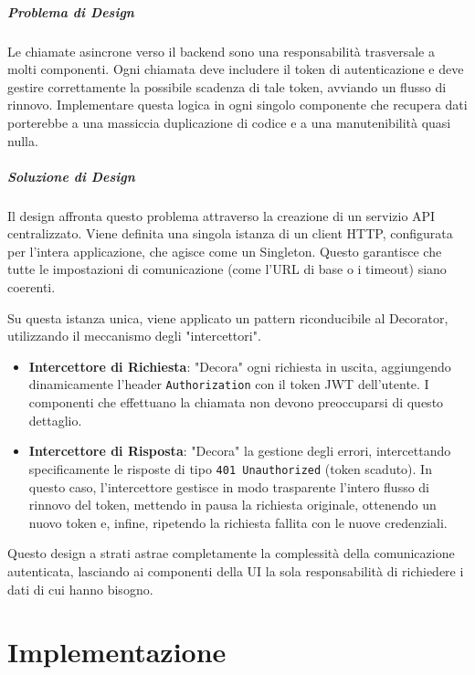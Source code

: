 \documentclass[12pt,a4paper,openright,twoside]{book}
\begin{document}
\paragraph{Problema di Design}
Le chiamate asincrone verso il backend sono una responsabilità trasversale a molti componenti. Ogni chiamata deve includere il token di autenticazione e deve gestire correttamente la possibile scadenza di tale token, avviando un flusso di rinnovo. Implementare questa logica in ogni singolo componente che recupera dati porterebbe a una massiccia duplicazione di codice e a una manutenibilità quasi nulla.

\paragraph{Soluzione di Design}
Il design affronta questo problema attraverso la creazione di un servizio API centralizzato. Viene definita una singola istanza di un client HTTP, configurata per l'intera applicazione, che agisce come un Singleton. Questo garantisce che tutte le impostazioni di comunicazione (come l'URL di base o i timeout) siano coerenti.

Su questa istanza unica, viene applicato un pattern riconducibile al Decorator, utilizzando il meccanismo degli "intercettori".
\begin{itemize}
    \item \textbf{Intercettore di Richiesta}: "Decora" ogni richiesta in uscita, aggiungendo dinamicamente l'header \texttt{Authorization} con il token JWT dell'utente. I componenti che effettuano la chiamata non devono preoccuparsi di questo dettaglio.
    \item \textbf{Intercettore di Risposta}: "Decora" la gestione degli errori, intercettando specificamente le risposte di tipo \texttt{401 Unauthorized} (token scaduto). In questo caso, l'intercettore gestisce in modo trasparente l'intero flusso di rinnovo del token, mettendo in pausa la richiesta originale, ottenendo un nuovo token e, infine, ripetendo la richiesta fallita con le nuove credenziali.
\end{itemize}
Questo design a strati astrae completamente la complessità della comunicazione autenticata, lasciando ai componenti della UI la sola responsabilità di richiedere i dati di cui hanno bisogno.

\chapter{Implementazione}
\label{chap:implementazione}
\end{document}
